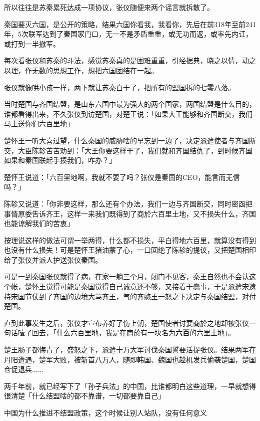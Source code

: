 \documentclass[UTF8, 11pt, oneside]{ctexart}
\newcommand{\zd}[1]{\textbf{\textcolor[RGB]{123,12,0}{#1}}} %
\begin{document}
所以往往是苏秦累死达成一项协议，张仪随便来两个谣言就拆散了。

秦国要灭六国，是公开的策略，结果六国你看我，我看你，先后在前318年至前241年，5次联军达到了秦国家门口，无一不是矛盾重重，或无功而返，或率先内讧，或打到一半撤军。

每次看张仪和苏秦的斗法，感觉苏秦真的是困难重重，引经据典，晓之以情，动之以理，作无数的思想工作，想把六国团结在一起。

张仪就像哄小孩一样，两下就让苏秦白干了，把所有的盟国拆的七零八落。

当时楚国与齐国结盟，是山东六国中最为强大的两个国家，两国结盟是什么目的，谁都看得出来，不久张仪到访楚国，对楚王说：「如果大王能够和齐国断交，我们马上送你们六百里地」

楚怀王一听大喜过望，什么秦国的威胁啥的早忘到一边了，决定派遣使者与齐国断交，大臣陈轸苦苦劝到：「大王你要这样干了，我们就和齐国结仇了，到时候齐国如果和秦国联起手揍我们，咋办？」

楚怀王说道：「六百里地啊，我就不要了吗？张仪是秦国的CEO，能言而无信吗？」

陈轸又说道：「你非要这样，那么还有个办法，我们一边与齐国断交，同时密函把事情原委告诉齐王，这样一来我们既得到了商於六百里土地，又不损失什么，齐国也能谅解我们的苦衷」

按理说这样的做法可谓一举两得，什么都不损失，平白得地六百里，就算没有得到也没有什么损失！可是楚怀王猪油蒙了心，一口回绝了陈轸的提议，又把楚国相印给了张仪并派人护送张仪秦国。

可是一到秦国张仪就得了病，在家一躺三个月，闭门不见客，秦王自然也不会认这个帐，楚怀王觉得可能是秦国觉得自己诚意还不够，又接着干蠢事，于是派遣宋遗持宋国节仗到了齐国的边境大骂齐王，气的齐愍王一怒之下决定与秦国结盟，对付楚国。

直到此事发生之后，张仪才宣布养好了伤上朝，楚国使者讨要商於之地却被张仪一句话噎了回去，「什么六百里地，我是在商於有一块名为\zd{六百}的六里土地」。

楚王肠子都悔青了，盛怒之下，派遣十万大军讨伐秦国誓要活捉张仪。结果两军在丹阳遭遇，楚军大败，被斩首八万人，随即韩国、魏国也趁机发兵偷袭楚国，楚国仓促退兵......

两千年前，就已经写下了「孙子兵法」的中国，比谁都明白这些道理，一早就想得很清楚「什么结盟啥的都不靠谱，一切都要靠自己」

中国为什么推进不结盟政策，这个时候让别人站队，没有任何意义



\section{}
\end{document}
